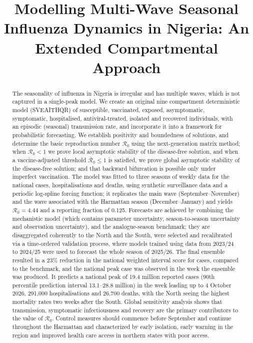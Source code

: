 \documentclass[12pt,a4paper]{article}
\title{\textbf{Modelling Multi-Wave Seasonal Influenza Dynamics in Nigeria: An Extended Compartmental Approach}}
\theoremstyle{definition}
\theoremstyle{remark}
\begin{document}
\date{}
\maketitle

\begin{abstract}
The seasonality of influenza in Nigeria is irregular and has multiple waves, which is not captured in a single-peak model. We create an original nine compartment deterministic model (SVEAITHQR) of susceptible, vaccinated, exposed, asymptomatic, symptomatic, hospitalised, antiviral-treated, isolated and recovered individuals, with an episodic (seasonal) transmission rate, and incorporate it into a framework for probabilistic forecasting. We establish positivity and boundedness of solutions, and determine the basic reproduction number $\mathcal{R}_0$ using the next-generation matrix method; when $\mathcal{R}_0<1$ we prove local asymptotic stability of the disease-free solution, and when a vaccine-adjusted threshold $\bar{\mathcal{R}}_0\le 1$ is satisfied, we prove global asymptotic stability of the disease-free solution; and that backward bifurcation is possible only under imperfect vaccination. The model was fitted to three seasons of weekly data for the national cases, hospitalisations and deaths, using synthetic surveillance data and a periodic log-spline forcing function; it replicates the main wave (September–November) and the wave associated with the Harmattan season (December–January) and yields $\mathcal{R}_0=4.44$ and a reporting fraction of 0.125. Forecasts are achieved by combining the mechanistic model (which contains parameter uncertainty, season-to-season uncertainty and observation uncertainty), and the analogue-season benchmark; they are disaggregated coherently to the North and the South, were selected and recalibrated via a time-ordered validation process, where models trained using data from 2023/24 to 2024/25 were used to forecast the whole season of 2025/26. The final ensemble resulted in a 23\% reduction in the national weighted interval score for cases, compared to the benchmark, and the national peak case was observed in the week the ensemble was produced. It predicts a national peak of 19.4 million reported cases (90th percentile prediction interval 13.1--28.8 million) in the week leading up to 4 October 2026, 291{,}000 hospitalisations and 26{,}700 deaths, with the North seeing the highest mortality rates two weeks after the South. Global sensitivity analysis shows that transmission, symptomatic infectiousness and recovery are the primary contributors to the value of $\mathcal{R}_0$. Control measures should commence before September and continue throughout the Harmattan and characterized by early isolation, early warning in the region and improved health care access in northern states with poor access.
\end{abstract}
\end{document}
